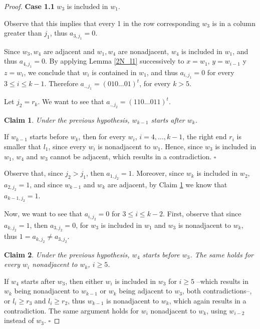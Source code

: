 \documentclass[a4paper,10pt]{report}
\theoremstyle{plain}
\newtheorem{claim}{Claim}[section]
\theoremstyle{remark}
\theoremstyle{plain}
\newcommand*{\QED}{\hfill\ensuremath{\square}}%
\begin{document}
\begin{proof}
	\vspace{.5mm}
	\textbf{Case 1.1} $w_3$ is included in $w_1$.
	
	Observe that this implies that every 1 in the row corresponding $w_3$ is in a column greater than $j_1$, thus $a_{3, j_1} = 0$.
	
	Since $w_3,w_4$ are adjacent and $w_1,w_4$ are nonadjacent, $w_4$ is included in $w_1$, and thus $a_{4,j_1} = 0$. 
	By applying Lemma \ref{2N_l1} successively to $x = w_1$, $y = w_{i-1}$ y $z = w_i$, we conclude that $w_i$ is contained in $w_1$, 
	and thus $a_{i,j_1} = 0$ for every $3 \leq i \leq k-1$.
	Therefore $a_{.,j_1} = ( 0 1 0 ... 0 1)^{t}$, for every $k > 5$.
	
	\vspace{.5mm}
	Let $j_2 = r_k$. 
	We want to see that $a_{.,j_2} = ( 1 1 0 ... 0 1 1)^{t}$.
	
	\begin{claim} \label{2N_c2}
		Under the previous hypothesis, $w_{k-1}$ starts after $w_k$.
	\end{claim}
	
	If $w_{k-1}$ starts before $w_k$, then for every $w_i$, $i=4, \ldots, k-1$,
	the right end $r_i$ is smaller that $l_1$, since every $w_i$ is nonadjacent to $w_1$. Hence, since $w_3$ is included in $w_1$, $w_4$ and $w_3$ cannot be adjacent, which results in a contradiction. \QED
	 	
	Observe that, since $j_2 > j_1$, then $a_{1,j_2} = 1$. 
	Moreover, since $w_k$ is included in $w_2$, $a_{2,j_2} = 1$, 
	and since $w_{k-1}$ and $w_k$ are adjacent, by Claim \ref{2N_c2} we know that $a_{k-1,j_2} = 1$.
	
	Now, we want to see that $a_{i,j_2} = 0$ for $3 \leq i \leq k-2$.
	First, observe that since $a_{k, j_2} = 1$, then $a_{3, j_2} = 0$, for $w_3$ is included in $w_1$ and $w_3$ is nonadjacent to $w_k$, thus $1 = a_{k, j_2} \neq a_{3, j_2}$.
	
	\begin{claim} \label{2N_c3}
		Under the previous hypothesis, $w_4$ starts before $w_3$.
		The same holds for every $w_i$ nonadjacent to $w_k$, $i \geq 5$. 	
	\end{claim}
	
	If $w_4$ starts after $w_3$, then either $w_i$ is included in $w_3$ for $i \geq 5$ --which results in $w_k$ being nonadjacent to $w_{k-1}$ or $w_k$ being adjacent to $w_3$, both contradictions--, or $l_i \geq r_3$ and $l_i \geq r_2$, thus $w_{k-1}$ is nonadjacent to $w_k$, which again results in a contradiction.
	The same argument holds for $w_i$ nonadjacent to $w_k$, using $w_{i-2}$ instead of $w_3$. \QED
	

\end{proof}
\end{document}
